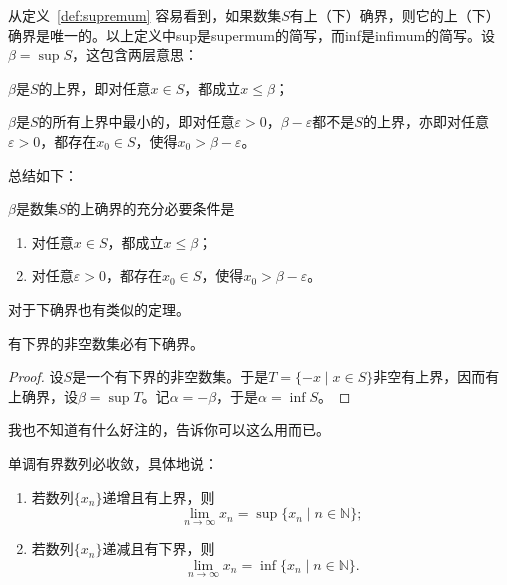 \documentclass[zihao = -4, linespread = 1.5]{ctexart} %
\begin{document}
从定义~\ref{def:supremum} 容易看到，如果数集$S$有上（下）确界，则它的上（下）确界是唯一的。以上定义中sup是supermum的简写，而inf是infimum的简写。设$\beta = \sup S$，这包含两层意思：\begin{enumerate*}[label=(\roman*)]
\item $\beta$是$S$的上界，即对任意$x \in S$，都成立$x\leqslant \beta$；
\item $\beta$是$S$的所有上界中最小的，即对任意$\varepsilon > 0$，$\beta - \varepsilon$都不是$S$的上界，亦即对任意$\varepsilon > 0$，都存在$x_0 \in S$，使得$x_0 > \beta - \varepsilon$。
\end{enumerate*}
总结如下：
\begin{theorem}\label{thm:1}
$\beta$是数集$S$的上确界的充分必要条件是
\begin{enumerate}[label=\textup{(\arabic*)},leftmargin=2\parindent]
  \item 对任意$x \in S$，都成立$x \leq \beta$；
  \item 对任意$\varepsilon > 0$，都存在$x_0 \in S$，使得$x_0 > \beta - \varepsilon$。
\end{enumerate}
\end{theorem}
对于下确界也有类似的定理。


\begin{corollary}[确界原理]\label{cor:1}
有下界的非空数集必有下确界。
\end{corollary}

\begin{proof}
  设$S$是一个有下界的非空数集。于是$T = \{-x \mid x \in S\}$非空有上界，因而有上确界，设$\beta = \sup T$。记$\alpha = -\beta$，于是$\alpha = \inf S$。
\end{proof}

\begin{remark}
我也不知道有什么好注的，告诉你可以这么用而已。
\end{remark}

\begin{theorem}[单调收敛定理]\label{thm:monotone}
  单调有界数列必收敛，具体地说：
  \begin{enumerate}[label=\textup{(\arabic*)}]
    \item 若数列$\{x_n \}$递增且有上界，则
    \[\lim_{n \to \infty} x_n = \sup\{x_n \mid n \in \mathbb{N} \}; \]

    \item 若数列$\{x_n \}$递减且有下界，则
    \[\lim_{n \to \infty} x_n = \inf \{x_n \mid n \in \mathbb{N} \}. \]
  \end{enumerate}
\end{theorem}
\end{document}
